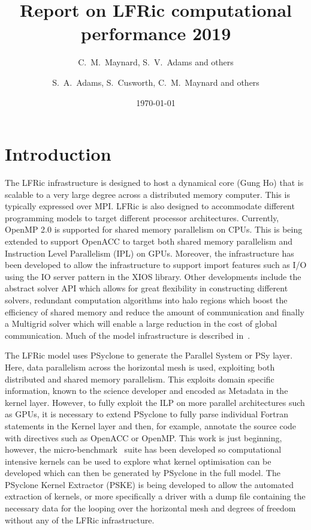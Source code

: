 \documentclass[11pt]{article}
\author{C.~M.~Maynard, S.~V.~Adams and others}
\author{S.~A.~Adams, S.~Cusworth, C.~M.~Maynard and others}
\title{Report on LFRic computational performance 2019}
\date{\today}
\begin{document}
\maketitle
\medskip
\section{Introduction\label{sec:intro}}
The LFRic infrastructure is designed to host a dynamical core (Gung Ho)
that is scalable to a very large degree across a distributed memory
computer. This is typically expressed over MPI. LFRic is also designed
to accommodate different programming models to target different
processor architectures. Currently, OpenMP 2.0 is supported for shared
memory parallelism on CPUs. This is being extended to support OpenACC
to target both shared memory parallelism and Instruction Level
Parallelism (IPL) on GPUs. Moreover, the infrastructure has been
developed to allow the infrastructure to support import features such
as I/O using the IO server pattern in the XIOS library. Other
developments include the abstract solver API which allows for great
flexibility in constructing different solvers, redundant computation
algorithms into halo regions which boost the efficiency of shared
memory and reduce the amount of communication and finally a Multigrid
solver which will enable a large reduction in the cost of global communication.
Much of the model infrastructure is described in~\cite{LFRic}.

The LFRic model uses PSyclone to generate the Parallel System or PSy
layer. Here, data parallelism across the horizontal mesh is used,
exploiting both distributed and shared memory parallelism. This
exploits domain specific information, known to the science developer
and encoded as Metadata in the kernel layer. However, to
fully exploit the ILP on more parallel architectures such as GPUs, it
is necessary to extend PSyclone to fully parse individual Fortran
statements in the Kernel layer and then, for example, annotate the
source code with directives such as OpenACC or OpenMP. This work is just beginning,
however, the micro-benchmark~\cite{lfric-microbenchmarks} suite has been developed so computational
intensive kernels can be used to explore what kernel optimisation can
be developed which can then be generated by PSyclone in the full
model. The PSyclone Kernel Extractor (PSKE) is being developed to
allow the automated extraction of kernels, or more specifically a
driver with a dump file containing the necessary data for the looping
over the horizontal mesh and degrees of freedom without any of the
LFRic infrastructure.
\end{document}

